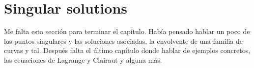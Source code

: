 \section{Singular solutions}

{\color{red} Me falta esta sección para terminar el capítulo. Había pensado hablar un poco de los puntos singulares y las soluciones asociadas, la envolvente de una familia de curvas y tal. Después falta el último capítulo donde hablar de ejemplos concretos, las ecuaciones de Lagrange y Clairaut y alguna más.}
